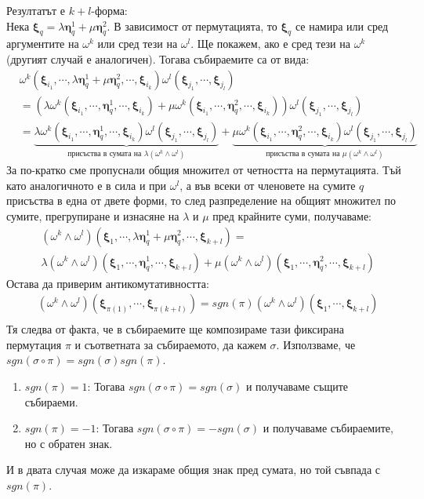 \documentclass[12pt]{article}
\newcommand\myxi[0]{\boldsymbol{\xi}}
\newcommand\myeta[0]{\boldsymbol{\eta}}
\begin{document}
\begin{large}
  Резултатът е $k+l$-форма:\\
  Нека $\myxi_q=\lambda\myeta_q^1+\mu\myeta_q^2$. В зависимост от пермутацията, то $\myxi_q$ се намира или сред аргументите на $\omega^k$ или сред тези на $\omega^l$. Ще покажем, ако е сред тези на $\omega^k$(другият случай е аналогичен). Тогава събираемите са от вида:
  \begin{align*}
    &\omega^k(\myxi_{i_1},\cdots,\lambda\myeta_q^1+\mu\myeta_q^2 ,\cdots,\myxi_{i_k})\omega^l(\myxi_{j_1},\cdots,\myxi_{j_l}) \\
    &=(\lambda\omega^k(\myxi_{i_1},\cdots,\myeta_q^1,\cdots,\myxi_{i_k}) + \mu\omega^k(\myxi_{i_1},\cdots,\myeta_q^2,\cdots,\myxi_{i_k}))\omega^l(\myxi_{j_1},\cdots,\myxi_{j_l}) \\
    &=\underbrace{\lambda\omega^k(\myxi_{i_1},\cdots,\myeta_q^1,\cdots,\myxi_{i_k})\omega^l(\myxi_{j_1},\cdots,\myxi_{j_l})
    }_{\text{присъства в сумата на $\lambda(\omega^k \wedge \omega^l)$}}+
    \underbrace{\mu\omega^k(\myxi_{i_1},\cdots,\myeta_q^2,\cdots,\myxi_{i_k})\omega^l(\myxi_{j_1},\cdots,\myxi_{j_l})
    }_{\text{присъства в сумата на $\mu(\omega^k \wedge \omega^l)$}}
  \end{align*}
  За по-кратко сме пропуснали общия множител от четността на пермутацията. Тъй като аналогичното е в сила и при $\omega^l$, а във всеки от членовете на сумите $q$ присъства в една от двете форми, то след разпределение на общият множител по сумите, прегрупиране и изнасяне на $\lambda$ и $\mu$ пред крайните суми, получаваме:
  \begin{align*}
    &(\omega^k \wedge \omega^l)(\myxi_1,\cdots,\lambda\myeta_q^1+\mu\myeta_q^2,\cdots,\myxi_{k+l})=\\
    &\lambda(\omega^k \wedge \omega^l)(\myxi_1,\cdots,\myeta_q^1,\cdots,\myxi_{k+l})+ \mu(\omega^k \wedge \omega^l)(\myxi_1,\cdots,\myeta_q^2,\cdots,\myxi_{k+l})
  \end{align*}
  Остава да приверим антикомутативността:
  \begin{align*}
    &(\omega^k \wedge \omega^l)(\myxi_{\pi(1)},\cdots,\myxi_{\pi(k+l)})= sgn(\pi)(\omega^k \wedge \omega^l)(\myxi_1,\cdots,\myxi_{k+l}) \\
  \end{align*}
  Тя следва от факта, че в събираемите ще композираме тази фиксирана пермутация $\pi$ и съответната за събираемото, да кажем $\sigma$. Използваме, че $sgn(\sigma \circ \pi)=sgn(\sigma)sgn(\pi)$.
\begin{enumerate}[label=\alph*)]
  \item $sgn(\pi)=1$: Тогава $sgn(\sigma \circ \pi)=sgn(\sigma)$ и получаваме същите събираеми.
  \item $sgn(\pi)=-1$: Тогава $sgn(\sigma \circ \pi)=-sgn(\sigma)$ и получаваме събираемите, но с обратен знак.
\end{enumerate}
И в двата случая може да изкараме общия знак пред сумата, но той съвпада с $sgn(\pi)$.


\end{large}
\end{document}
